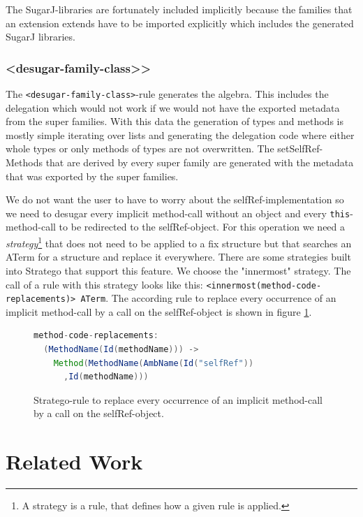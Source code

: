 \documentclass{report}
\begin{document}
The SugarJ-libraries are fortunately included implicitly because the families that an extension extends have to be imported explicitly which includes the generated SugarJ libraries.

\subsubsection{\textless{}desugar-family-class>\textgreater}
The \lstinline{<desugar-family-class>}-rule generates the algebra. This includes the delegation which would not work if we would not have the exported metadata from the super families. With this data the generation of types and methods is mostly simple iterating over lists and generating the delegation code where either whole types or only methods of types are not overwritten. The setSelfRef-Methods that are derived by every super family are generated with the metadata that was exported by the super families.

We do not want the user to have to worry about the selfRef-implementation so we need to desugar every implicit method-call without an object and every \lstinline{this}-method-call to be redirected to the selfRef-object. For this operation we need a \emph{strategy}\footnote{A strategy is a rule, that defines how a given rule is applied.} that does not need to be applied to a fix structure but that searches an ATerm for a structure and replace it everywhere. There are some strategies built into Stratego that support this feature. We choose the "innermost" strategy. The call of a rule with this strategy looks like this: \lstinline{<innermost(method-code-replacements)> ATerm}. The according rule to replace every occurrence of an implicit method-call by a call on the selfRef-object is shown in figure \ref{replaceMethodBySelfRef}.

\begin{figure}[H]
\begin{lstlisting}[language=java,breaklines=false,morekeywords={familyname,super,familyClasses},keywordstyle=\bfseries\color{OliveGreen}]
method-code-replacements:
  (MethodName(Id(methodName))) ->
    Method(MethodName(AmbName(Id("selfRef"))
      ,Id(methodName)))
\end{lstlisting}
\caption{Stratego-rule to replace every occurrence of an implicit method-call by a call on the selfRef-object.}
\label{replaceMethodBySelfRef}
\end{figure}

\section{Related Work}
\end{document}
